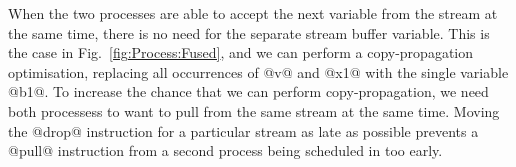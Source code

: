 
When the two processes are able to accept the next variable from the stream at the same time, there is no need for the separate stream buffer variable. This is the case in Fig.~\ref{fig:Process:Fused}, and we can perform a copy-propagation optimisation, replacing all occurrences of @v@ and @x1@ with the single variable @b1@. To increase the chance that we can perform copy-propagation, we need both processess to want to pull from the same stream at the same time. Moving the @drop@ instruction for a particular stream as late as possible prevents a @pull@ instruction from a second process being scheduled in too early.







